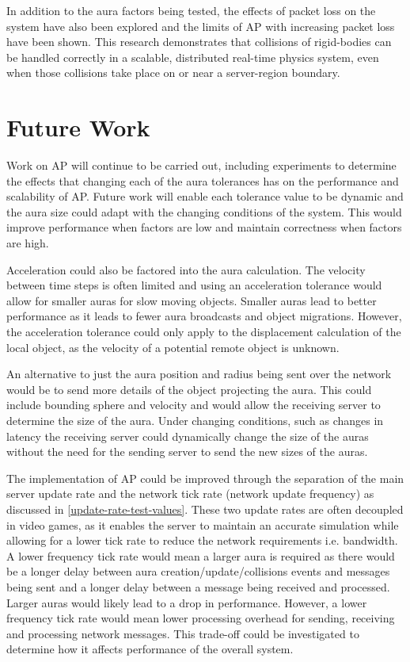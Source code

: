 In addition to the aura factors being tested, the effects of packet loss on the system have also been explored and the limits of AP with increasing packet loss have been shown. This research demonstrates that collisions of rigid-bodies can be handled correctly in a scalable, distributed real-time physics system, even when those collisions take place on or near a server-region boundary.

\section{Future Work}
Work on AP will continue to be carried out, including experiments to determine the effects that changing each of the aura tolerances has on the performance and scalability of AP. Future work will enable each tolerance value to be dynamic and the aura size could adapt with the changing conditions of the system. This would improve performance when factors are low and maintain correctness when factors are high.

Acceleration could also be factored into the aura calculation. The velocity between time steps is often limited and using an acceleration tolerance would allow for smaller auras for slow moving objects. Smaller auras lead to better performance as it leads to fewer aura broadcasts and object migrations. However, the acceleration tolerance could only apply to the displacement calculation of the local object, as the velocity of a potential remote object is unknown.

An alternative to just the aura position and radius being sent over the network would be to send more details of the object projecting the aura. This could include bounding sphere and velocity and would allow the receiving server to determine the size of the aura. Under changing conditions, such as changes in latency the receiving server could dynamically change the size of the auras without the need for the sending server to send the new sizes of the auras.

The implementation of AP could be improved through the separation of the main server update rate and the network tick rate (network update frequency) as discussed in \ref{update-rate-test-values}. These two update rates are often decoupled in video games, as it enables the server to maintain an accurate simulation while allowing for a lower tick rate to reduce the network requirements i.e. bandwidth. A lower frequency tick rate would mean a larger aura is required as there would be a longer delay between aura creation/update/collisions events and messages being sent and a longer delay between a message being received and processed. Larger auras would likely lead to a drop in performance. However, a lower frequency tick rate would mean lower processing overhead for sending, receiving and processing network messages. This trade-off could be investigated to determine how it affects performance of the overall system.

